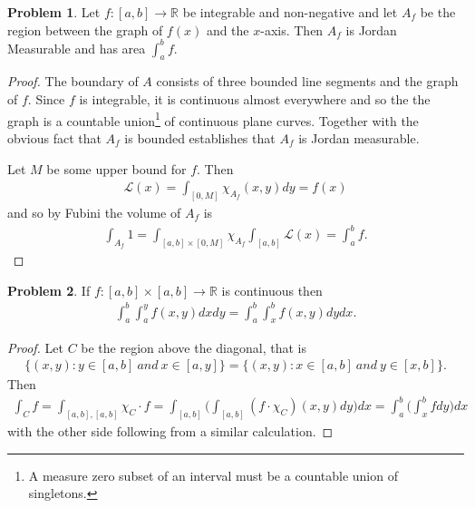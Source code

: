 \documentclass[20pt]{article}
\theoremstyle{plain}
\theoremstyle{definition}
\newtheorem*{problem}{Problem}
\newcommand{\reals}{\mathbb{R}}
\begin{document}
\begin{problem}{3.26}
  Let $f: [a, b] \to \reals$ be integrable and non-negative and let
  $A_f$ be the region between the graph of $f(x)$ and the $x$-axis.
  Then $A_f$ is Jordan Measurable and has area $\int_a^b f.$
\end{problem}

\begin{proof}
  The boundary of $A$ consists of three bounded line segments and the graph of $f$.
  Since $f$ is integrable, it is continuous almost everywhere and so the
  the graph is a countable union\footnote{A measure zero subset of an interval must be a countable union of singletons.}
   of continuous plane curves.  Together with
  the obvious fact that $A_f$ is bounded establishes that $A_f$ is
  Jordan measurable.

  Let $M$ be some upper bound for $f$.  Then
  \begin{align*}
    \mathcal{L}(x) = \int_{[0, M]} \chi_{A_f}(x, y)dy = f(x)
  \end{align*}
  and so by Fubini the volume of $A_f$ is
  \begin{align*}
    \int_{A_f}1 =
    \int_{[a, b]\times[0, M]} \chi_{A_f}
    \int_{[a, b]} \mathcal{L}(x) =
    \int_a^b f.
  \end{align*}
\end{proof}



\begin{problem}{3.27}
  If $f: [a, b] \times [a, b] \to \reals$ is continuous then
  \begin{align*}
    \int_a^b \int_a^y f(x, y)dxdy = \int_a^b \int_x^b f(x, y)dy  dx.
  \end{align*}
\end{problem}

\begin{proof}
  Let $C$ be the region above the diagonal, that is
  \begin{align*}
    \{ (x, y) : y \in [a, b]\ and \ x \in [a, y] \} =
    \{ (x, y) : x \in [a, b]\ and \ y \in [x, b] \}.
  \end{align*}
  Then
  \begin{align*}
    \int_C f =
    \int_{[a, b], [a, b]}\chi_C \cdot f =
    \int_{[a, b]}\bigg(\int_{[a, b]}(f\cdot \chi_C)(x, y)dy\bigg)dx =
    \int_a^b \bigg(\int_x^b f dy\bigg)dx
  \end{align*}
  with the other side following from a similar calculation.
\end{proof}
\end{document}

